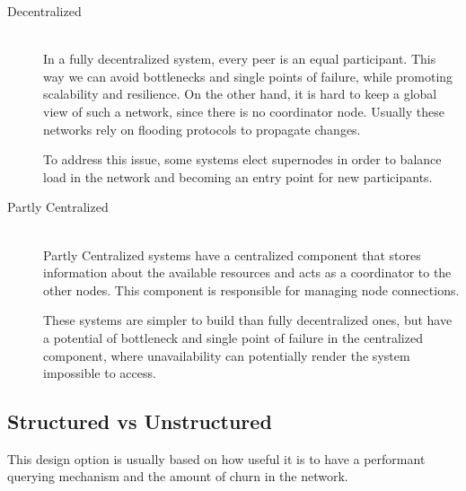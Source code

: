 \begin{description}
\item[Decentralized] \hfill \\
In a fully decentralized system, every peer is an equal participant. This way we can avoid bottlenecks and single points of failure, while promoting scalability and resilience. On the other hand, it is hard to keep a global view of such a network, since there is no coordinator node. Usually these networks rely on flooding protocols to propagate changes.\par
	To address this issue, some systems elect supernodes in order to balance load in the network and becoming an entry point for new participants.

\item[Partly Centralized] \hfill \\
Partly Centralized systems have a centralized component that stores information about the available resources and acts as a coordinator to the other nodes. This component is responsible for managing node connections.\par
	These systems are simpler to build than fully decentralized ones, but have a potential of bottleneck and single point of failure in the centralized component, where unavailability can potentially render the system impossible to access.

\end{description}

\subsection{Structured vs Unstructured}
This design option is usually based on how useful it is to have a performant querying mechanism and the amount of churn in the network.

